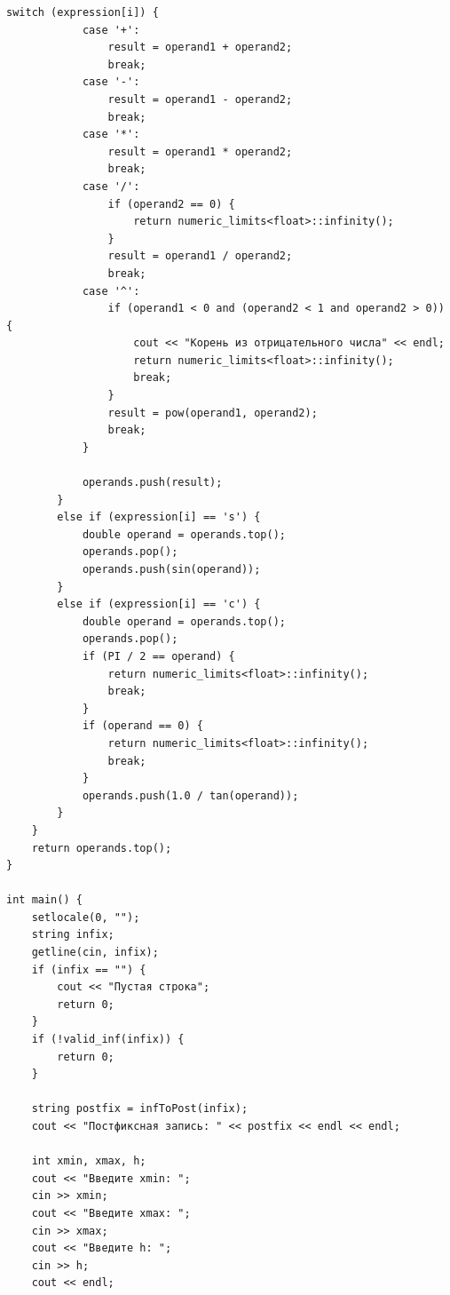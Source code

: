 \documentclass[12pt, a4paper]{article}
\begin{document}
\begin{lstlisting}[caption={Исходный код}, label={lst:label1}]
            switch (expression[i]) {
            case '+':
                result = operand1 + operand2;
                break;
            case '-':
                result = operand1 - operand2;
                break;
            case '*':
                result = operand1 * operand2;
                break;
            case '/':
                if (operand2 == 0) {
                    return numeric_limits<float>::infinity();
                }
                result = operand1 / operand2;
                break;
            case '^':
                if (operand1 < 0 and (operand2 < 1 and operand2 > 0)) {
                    cout << "Корень из отрицательного числа" << endl;
                    return numeric_limits<float>::infinity();
                    break;
                }
                result = pow(operand1, operand2);
                break;
            }

            operands.push(result);
        }
        else if (expression[i] == 's') {
            double operand = operands.top();
            operands.pop();
            operands.push(sin(operand));
        }
        else if (expression[i] == 'c') {
            double operand = operands.top();
            operands.pop();
            if (PI / 2 == operand) {
                return numeric_limits<float>::infinity();
                break;
            }
            if (operand == 0) {
                return numeric_limits<float>::infinity();
                break;
            }
            operands.push(1.0 / tan(operand));
        }
    }
    return operands.top();
}

int main() {
    setlocale(0, "");
    string infix;
    getline(cin, infix);
    if (infix == "") {
        cout << "Пустая строка";
        return 0;
    }
    if (!valid_inf(infix)) {
        return 0;
    }
    
    string postfix = infToPost(infix);
    cout << "Постфиксная запись: " << postfix << endl << endl;

    int xmin, xmax, h;
    cout << "Введите xmin: ";
    cin >> xmin;
    cout << "Введите xmax: ";
    cin >> xmax;
    cout << "Введите h: ";
    cin >> h;
    cout << endl;
    

\end{lstlisting}
\end{document}
